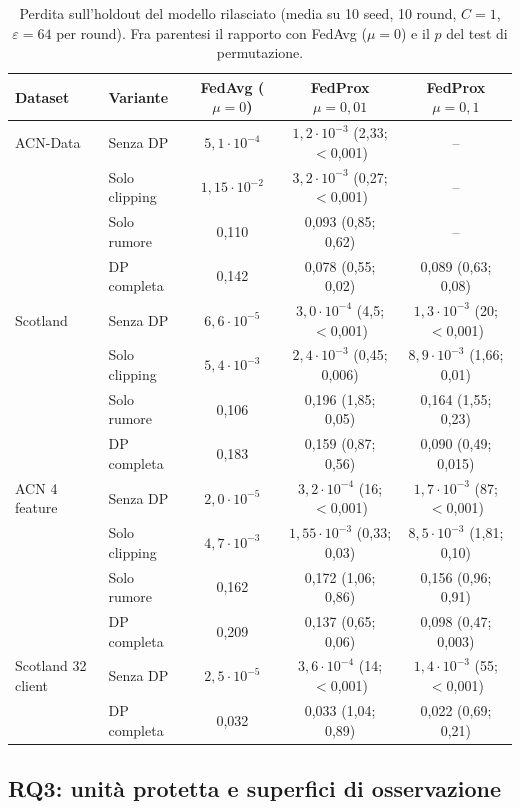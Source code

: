 \begin{table}[t]
\caption{Perdita sull'holdout del modello rilasciato (media su 10 seed, 10 round, $C=1$,
$\varepsilon=64$ per round). Fra parentesi il rapporto con FedAvg ($\mu=0$) e il $p$ del test
di permutazione.}
\label{tab:utilita}
\centering\footnotesize
\setlength{\tabcolsep}{4pt}
\renewcommand{\arraystretch}{1.15}
\begin{tabular}{@{}llccc@{}}
\toprule
Dataset & Variante & FedAvg ($\mu=0$) & FedProx $\mu=0{,}01$ & FedProx $\mu=0{,}1$ \\
\midrule
ACN-Data & Senza DP & $5{,}1\cdot10^{-4}$ & $1{,}2\cdot10^{-3}$ (2,33; $<$0,001) & -- \\
 & Solo clipping & $1{,}15\cdot10^{-2}$ & $3{,}2\cdot10^{-3}$ (0,27; $<$0,001) & -- \\
 & Solo rumore & 0,110 & 0,093 (0,85; 0,62) & -- \\
 & DP completa & 0,142 & 0,078 (0,55; 0,02) & 0,089 (0,63; 0,08) \\
\midrule
Scotland & Senza DP & $6{,}6\cdot10^{-5}$ & $3{,}0\cdot10^{-4}$ (4,5; $<$0,001) & $1{,}3\cdot10^{-3}$ (20; $<$0,001) \\
 & Solo clipping & $5{,}4\cdot10^{-3}$ & $2{,}4\cdot10^{-3}$ (0,45; 0,006) & $8{,}9\cdot10^{-3}$ (1,66; 0,01) \\
 & Solo rumore & 0,106 & 0,196 (1,85; 0,05) & 0,164 (1,55; 0,23) \\
 & DP completa & 0,183 & 0,159 (0,87; 0,56) & 0,090 (0,49; 0,015) \\
\midrule
ACN 4 feature & Senza DP & $2{,}0\cdot10^{-5}$ & $3{,}2\cdot10^{-4}$ (16; $<$0,001) & $1{,}7\cdot10^{-3}$ (87; $<$0,001) \\
 & Solo clipping & $4{,}7\cdot10^{-3}$ & $1{,}55\cdot10^{-3}$ (0,33; 0,03) & $8{,}5\cdot10^{-3}$ (1,81; 0,10) \\
 & Solo rumore & 0,162 & 0,172 (1,06; 0,86) & 0,156 (0,96; 0,91) \\
 & DP completa & 0,209 & 0,137 (0,65; 0,06) & 0,098 (0,47; 0,003) \\
\midrule
Scotland 32 client & Senza DP & $2{,}5\cdot10^{-5}$ & $3{,}6\cdot10^{-4}$ (14; $<$0,001) & $1{,}4\cdot10^{-3}$ (55; $<$0,001) \\
 & DP completa & 0,032 & 0,033 (1,04; 0,89) & 0,022 (0,69; 0,21) \\
\bottomrule
\end{tabular}
\end{table}

\subsection{RQ3: unità protetta e superfici di osservazione}
\label{subsec:res_unita}

